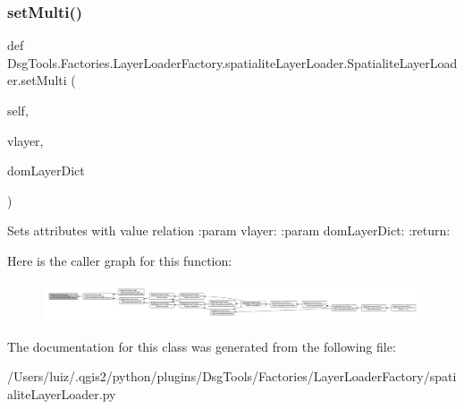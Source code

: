 \mbox{\label{class_dsg_tools_1_1_factories_1_1_layer_loader_factory_1_1spatialite_layer_loader_1_1_spatialite_layer_loader_a130db82fdcb6e28cd1a4ca12edec6c68}} 
\subsubsection{\texorpdfstring{set\+Multi()}{setMulti()}}
{\footnotesize\ttfamily def Dsg\+Tools.\+Factories.\+Layer\+Loader\+Factory.\+spatialite\+Layer\+Loader.\+Spatialite\+Layer\+Loader.\+set\+Multi (\begin{DoxyParamCaption}\item[{}]{self,  }\item[{}]{vlayer,  }\item[{}]{dom\+Layer\+Dict }\end{DoxyParamCaption})}

\begin{DoxyVerb}Sets attributes with value relation
:param vlayer:
:param domLayerDict:
:return:
\end{DoxyVerb}
 Here is the caller graph for this function\+:
\nopagebreak
\begin{figure}[H]
\begin{center}
\leavevmode
\includegraphics[width=350pt]{class_dsg_tools_1_1_factories_1_1_layer_loader_factory_1_1spatialite_layer_loader_1_1_spatialite_layer_loader_a130db82fdcb6e28cd1a4ca12edec6c68_icgraph}
\end{center}
\end{figure}


The documentation for this class was generated from the following file\+:\begin{DoxyCompactItemize}
\item 
/\+Users/luiz/.\+qgis2/python/plugins/\+Dsg\+Tools/\+Factories/\+Layer\+Loader\+Factory/spatialite\+Layer\+Loader.\+py\end{DoxyCompactItemize}
